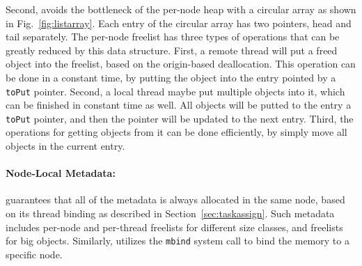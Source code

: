 Second, \NM{} avoids the bottleneck of the per-node heap with a circular array as shown in Fig.~\ref{fig:listarray}. Each entry of the circular array has two pointers, head and tail separately. The per-node freelist has three types of operations that can be greatly reduced by this data structure. First, a remote thread will put a freed object into the freelist, based on the origin-based deallocation. This operation can be done in a constant time, by putting the object into the entry pointed by a \texttt{toPut} pointer. Second, a local thread maybe put multiple objects into it, which can be finished in constant time as well. All objects will be putted to the entry  a \texttt{toPut} pointer, and then the pointer will be updated to the next entry. Third, the operations for getting objects from it can be done efficiently, by simply move all objects in the current entry. 

\paragraph{Node-Local Metadata:} \NM{} guarantees that all of the metadata is always allocated in the same node, based on its thread binding as described in Section~\ref{sec:taskassign}. Such metadata includes per-node and per-thread freelists for different size classes, and freelists for big objects. Similarly, \NM{} utilizes the \texttt{mbind} system call to bind the memory to a specific node.  

